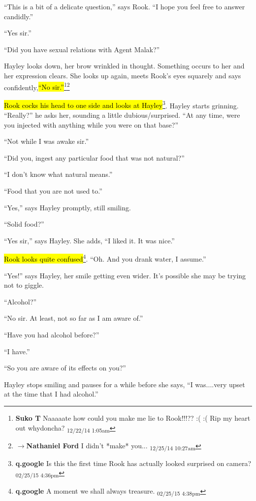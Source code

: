 ``This is a bit of a delicate question,'' says Rook.  ``I hope you feel free to answer candidly.''

``Yes sir.''

``Did you have sexual relations with Agent Malak?''

Hayley looks down, her brow wrinkled in thought.  Something occurs to her and her expression clears.  She looks up again, meets Rook's eyes squarely and says confidently,\hl{``No sir.''}\footnote{\textbf{Suko T }Naaaaate how could you make me lie to Rook!!!??  :(  :(   Rip my heart out whydoncha? \textsubscript{12/22/14 1:05am}}\footnote{$\rightarrow$\textbf{Nathaniel Ford }I didn't *make* you... \textsubscript{12/25/14 10:27am}}

\hl{Rook cocks his head to one side and looks at Hayley}\footnote{\textbf{q.google }Is this the first time Rook has actually looked surprised on camera? \textsubscript{02/25/15 4:36pm}}.   Hayley starts grinning.  ``Really?'' he asks her, sounding a little dubious/surprised.  ``At any time, were you injected with anything while you were on that base?''

``Not while I was awake sir.''

``Did you, ingest any particular food that was not natural?''

``I don't know what natural means.''

``Food that you are not used to.''

``Yes,'' says Hayley promptly, still smiling.

``Solid food?''

``Yes sir,'' says Hayley.  She adds, ``I liked it.  It was nice.''

\hl{Rook looks quite confused}\footnote{\textbf{q.google }A moment we shall always treasure. \textsubscript{02/25/15 4:38pm}}.  ``Oh.  And you drank water, I assume.''

``Yes!'' says Hayley, her smile getting even wider.  It's possible she may be trying not to giggle.

``Alcohol?''

``No sir.  At least, not so far as I am aware of.''

``Have you had alcohol before?''

``I have.''

``So you are aware of its effects on you?''

Hayley stops smiling and pauses for a while before she says, ``I was....very upset at the time that I had alcohol.''

